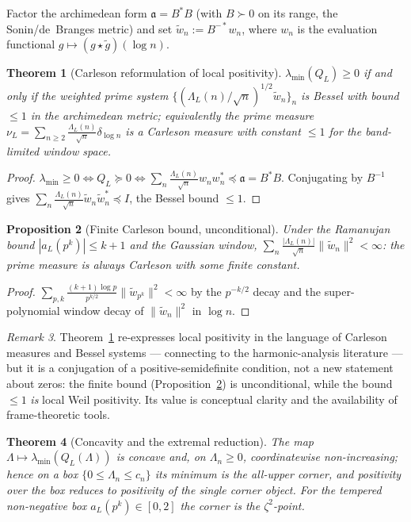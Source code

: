 \documentclass[11pt]{amsart}
\newtheorem{theorem}{Theorem}[section]
\newtheorem{proposition}[theorem]{Proposition}
\theoremstyle{definition}
\theoremstyle{remark}
\newtheorem{remark}[theorem]{Remark}
\newcommand{\fa}{\mathfrak a}
\begin{document}
Factor the archimedean form $\fa=B^{*}B$ (with $B\succ0$ on its range, the
Sonin/de~Branges metric) and set $\widetilde w_n:=B^{-*}w_n$, where $w_n$ is the
evaluation functional $g\mapsto(g\star\tilde g)(\log n)$.

\begin{theorem}[Carleson reformulation of local positivity]\label{thm:carleson}
$\lambda_{\min}(Q_L)\ge0$ if and only if the weighted prime system
$\{(\Lambda_L(n)/\sqrt n)^{1/2}\widetilde w_n\}_n$ is Bessel with bound $\le1$ in
the archimedean metric; equivalently the prime measure
$\nu_L=\sum_{n\ge2}\frac{\Lambda_L(n)}{\sqrt n}\delta_{\log n}$ is a Carleson
measure with constant $\le1$ for the band-limited window space.
\end{theorem}
\begin{proof}
$\lambda_{\min}\ge0\iff Q_L\succeq0\iff\sum_n\frac{\Lambda_L(n)}{\sqrt n}w_nw_n^{*}
\preceq\fa=B^{*}B$. Conjugating by $B^{-1}$ gives $\sum_n\frac{\Lambda_L(n)}
{\sqrt n}\widetilde w_n\widetilde w_n^{*}\preceq I$, the Bessel bound $\le1$.
\end{proof}

\begin{proposition}[Finite Carleson bound, unconditional]\label{prop:finite}
Under the Ramanujan bound $|a_L(p^k)|\le k+1$ and the Gaussian window,
$\sum_n\frac{|\Lambda_L(n)|}{\sqrt n}\|\widetilde w_n\|^2<\infty$: the prime
measure is always Carleson with \emph{some} finite constant.
\end{proposition}
\begin{proof}
$\sum_{p,k}\frac{(k+1)\log p}{p^{k/2}}\|\widetilde w_{p^k}\|^2<\infty$ by the
$p^{-k/2}$ decay and the super-polynomial window decay of $\|\widetilde w_n\|^2$
in $\log n$.
\end{proof}

\begin{remark}
Theorem~\ref{thm:carleson} re-expresses local positivity in the language of
Carleson measures and Bessel systems --- connecting to the harmonic-analysis
literature --- but it is a conjugation of a positive-semidefinite condition, not
a new statement about zeros: the finite bound (Proposition~\ref{prop:finite}) is
unconditional, while the bound $\le1$ \emph{is} local Weil positivity. Its value
is conceptual clarity and the availability of frame-theoretic tools.
\end{remark}

\begin{theorem}[Concavity and the extremal reduction]\label{thm:concave}
The map $\Lambda\mapsto\lambda_{\min}(Q_L(\Lambda))$ is concave and, on
$\Lambda_n\ge0$, coordinatewise non-increasing; hence on a box
$\{0\le\Lambda_n\le c_n\}$ its minimum is the all-upper corner, and positivity
over the box reduces to positivity of the single corner object. For the tempered
non-negative box $a_L(p^k)\in[0,2]$ the corner is the $\zeta^2$-point.
\end{theorem}
\end{document}
